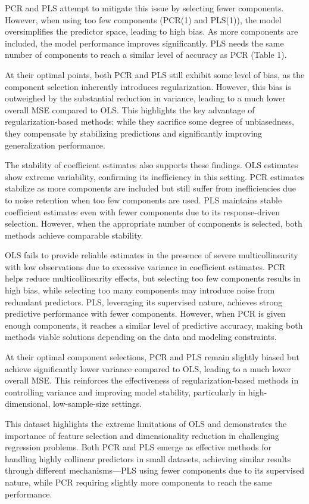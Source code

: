 \documentclass[11pt,twoside,a4paper]{article}
\begin{document}
PCR and PLS attempt to mitigate this issue by selecting fewer components. However, when using too few components (PCR(1) and PLS(1)), the model oversimplifies the predictor space, leading to high bias. As more components are included, the model performance improves significantly. PLS needs the same number of components to reach a similar level of accuracy as PCR (Table 1).

At their optimal points, both PCR and PLS still exhibit some level of bias, as the component selection inherently introduces regularization. However, this bias is outweighed by the substantial reduction in variance, leading to a much lower overall MSE compared to OLS. This highlights the key advantage of regularization-based methods: while they sacrifice some degree of unbiasedness, they compensate by stabilizing predictions and significantly improving generalization performance.

The stability of coefficient estimates also supports these findings. OLS estimates show extreme variability, confirming its inefficiency in this setting. PCR estimates stabilize as more components are included but still suffer from inefficiencies due to noise retention when too few components are used. PLS maintains stable coefficient estimates even with fewer components due to its response-driven selection. However, when the appropriate number of components is selected, both methods achieve comparable stability.

OLS fails to provide reliable estimates in the presence of severe multicollinearity with low observations due to excessive variance in coefficient estimates. PCR helps reduce multicollinearity effects, but selecting too few components results in high bias, while selecting too many components may introduce noise from redundant predictors. PLS, leveraging its supervised nature, achieves strong predictive performance with fewer components. However, when PCR is given enough components, it reaches a similar level of predictive accuracy, making both methods viable solutions depending on the data and modeling constraints.

At their optimal component selections, PCR and PLS remain slightly biased but achieve significantly lower variance compared to OLS, leading to a much lower overall MSE. This reinforces the effectiveness of regularization-based methods in controlling variance and improving model stability, particularly in high-dimensional, low-sample-size settings.

This dataset highlights the extreme limitations of OLS and demonstrates the importance of feature selection and dimensionality reduction in challenging regression problems. Both PCR and PLS emerge as effective methods for handling highly collinear predictors in small datasets, achieving similar results through different mechanisms—PLS using fewer components due to its supervised nature, while PCR requiring slightly more components to reach the same performance.
\end{document}

